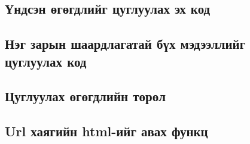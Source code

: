 \subsection{Үндсэн өгөгдлийг цуглуулах эх код}

\subsection{Нэг зарын шаардлагатай бүх мэдээллийг цуглуулах код}

\subsection{Цуглуулах өгөгдлийн төрөл}

\subsection{Url хаягийн html-ийг авах функц}

